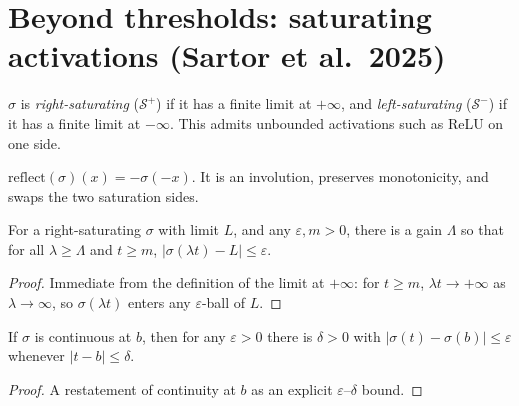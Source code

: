 \section{Beyond thresholds: saturating activations (Sartor et al.\ 2025)}

\begin{definition}\label{def:saturating}
  \leanok
  $\sigma$ is \emph{right-saturating} ($\mathcal{S}^+$) if it has a finite limit at $+\infty$, and
  \emph{left-saturating} ($\mathcal{S}^-$) if it has a finite limit at $-\infty$. This admits
  unbounded activations such as ReLU on one side.
\end{definition}

\begin{definition}\label{def:reflect}
  \leanok
  $\mathrm{reflect}(\sigma)(x) = -\sigma(-x)$. It is an involution, preserves monotonicity, and
  swaps the two saturation sides.
\end{definition}

\begin{lemma}\label{lem:sat-scaled}
  \leanok
  For a right-saturating $\sigma$ with limit $L$, and any $\varepsilon,m>0$, there is a gain
  $\Lambda$ so that for all $\lambda\ge\Lambda$ and $t\ge m$, $|\sigma(\lambda t)-L|\le\varepsilon$.
\end{lemma}
\begin{proof}\leanok
  Immediate from the definition of the limit at $+\infty$: for $t\ge m$, $\lambda t\to+\infty$ as
  $\lambda\to\infty$, so $\sigma(\lambda t)$ enters any $\varepsilon$-ball of $L$.
\end{proof}

\begin{lemma}\label{lem:approx-interior}
  \leanok
  If $\sigma$ is continuous at $b$, then for any $\varepsilon>0$ there is $\delta>0$ with
  $|\sigma(t)-\sigma(b)|\le\varepsilon$ whenever $|t-b|\le\delta$.
\end{lemma}
\begin{proof}\leanok
  A restatement of continuity at $b$ as an explicit $\varepsilon$--$\delta$ bound.
\end{proof}


